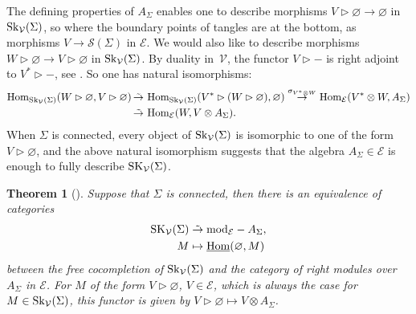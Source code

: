 \documentclass[pdftex]{sigma}%
\numberwithin{equation}{section}
\newtheorem{Theorem}{Theorem}[section]
\newcommand{\Hom}{\operatorname{Hom}}
\newcommand{\undHom}{\underline{\operatorname{Hom}}}
\begin{document}
\begin{Remark}\label{rmkTopPtsAndASigma}
The defining properties of $A_\Sigma$ enables one to describe morphisms $V \rhd \varnothing \to \varnothing$ in ${\rm Sk}_\mathcal{V}(\Sigma)$, so where the boundary points of tangles are at the bottom, as morphisms $V \to \mathscr{S}(\Sigma)$ in $\mathcal{E}$. We would also like to describe morphisms $W\rhd \varnothing \to V \rhd \varnothing$ in ${\rm Sk}_\mathcal{V}(\Sigma)$. By duality in~$\mathcal{V}$, the functor $V\rhd-$ is right adjoint to $V^*\rhd-$, see \cite[Proposition~7.1.6]{EGNO}. So one has natural isomorphisms:
\begin{align*}
\Hom_{{\rm Sk}_\mathcal{V}(\Sigma)}(W\rhd\varnothing, V \rhd\varnothing) &\,\tilde{\to} \, \Hom_{{\rm Sk}_\mathcal{V}(\Sigma)}(V^*\rhd( W \rhd \varnothing), \varnothing) \overset{\sigma_{V^*\otimes W}}{\to} \Hom_{\mathcal{E}}(V^*\otimes W, A_\Sigma)
\\
&\, \tilde{\to} \, \Hom_{\mathcal{E}}(W,V\otimes A_\Sigma).
\end{align*}
When $\Sigma$ is connected, every object of ${\rm Sk}_\mathcal{V}(\Sigma)$ is isomorphic to one of the form $V\rhd\varnothing$, and the above natural isomorphism suggests that the algebra $A_\Sigma\in\mathcal{E}$ is enough to fully describe ${\rm SK}_\mathcal{V}(\Sigma)$.
\end{Remark}
\begin{Theorem}[{\cite[Theorem~5.14]{BBJ}}] \label{thASigmaMods}
Suppose that $\Sigma$ is connected, then there is an equivalence of categories
\begin{align*}{\rm SK}_\mathcal{V}(\Sigma) &\; \tilde{\to}\; {\rm mod}_\mathcal{E}-A_\Sigma,
\\
M &\mapsto  \undHom(\varnothing,M)
\end{align*}
between the free cocompletion of ${\rm Sk}_\mathcal{V}(\Sigma)$ and the category of right modules over $A_\Sigma$ in $\mathcal{E}$. For $M$ of the form $V \rhd \varnothing$, $V\in\mathcal{E}$, which is always the case for $M \in {\rm Sk}_\mathcal{V}(\Sigma)$, this functor is given by $V\rhd \varnothing \mapsto V \otimes A_\Sigma$.
\end{Theorem}
\end{document}
